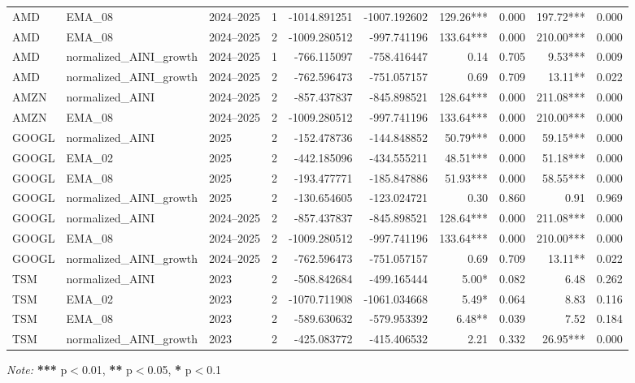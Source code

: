 \begin{table}[H]
{\begin{tabular}{l l l r r r r r r r}
AMD & EMA\_08 & 2024--2025 & 1 & -1014.891251 & -1007.192602 & 129.26*** & 0.000 & 197.72*** & 0.000 \\
AMD & EMA\_08 & 2024--2025 & 2 & -1009.280512 & -997.741196 & 133.64*** & 0.000 & 210.00*** & 0.000 \\
AMD & normalized\_AINI\_growth & 2024--2025 & 1 & -766.115097 & -758.416447 & 0.14 & 0.705 & 9.53*** & 0.009 \\
AMD & normalized\_AINI\_growth & 2024--2025 & 2 & -762.596473 & -751.057157 & 0.69 & 0.709 & 13.11** & 0.022 \\
AMZN & normalized\_AINI & 2024--2025 & 2 & -857.437837 & -845.898521 & 128.64*** & 0.000 & 211.08*** & 0.000 \\
AMZN & EMA\_08 & 2024--2025 & 2 & -1009.280512 & -997.741196 & 133.64*** & 0.000 & 210.00*** & 0.000 \\
GOOGL & normalized\_AINI & 2025 & 2 & -152.478736 & -144.848852 & 50.79*** & 0.000 & 59.15*** & 0.000 \\
GOOGL & EMA\_02 & 2025 & 2 & -442.185096 & -434.555211 & 48.51*** & 0.000 & 51.18*** & 0.000 \\
GOOGL & EMA\_08 & 2025 & 2 & -193.477771 & -185.847886 & 51.93*** & 0.000 & 58.55*** & 0.000 \\
GOOGL & normalized\_AINI\_growth & 2025 & 2 & -130.654605 & -123.024721 & 0.30 & 0.860 & 0.91 & 0.969 \\
GOOGL & normalized\_AINI & 2024--2025 & 2 & -857.437837 & -845.898521 & 128.64*** & 0.000 & 211.08*** & 0.000 \\
GOOGL & EMA\_08 & 2024--2025 & 2 & -1009.280512 & -997.741196 & 133.64*** & 0.000 & 210.00*** & 0.000 \\
GOOGL & normalized\_AINI\_growth & 2024--2025 & 2 & -762.596473 & -751.057157 & 0.69 & 0.709 & 13.11** & 0.022 \\
TSM & normalized\_AINI & 2023 & 2 & -508.842684 & -499.165444 & 5.00* & 0.082 & 6.48 & 0.262 \\
TSM & EMA\_02 & 2023 & 2 & -1070.711908 & -1061.034668 & 5.49* & 0.064 & 8.83 & 0.116 \\
TSM & EMA\_08 & 2023 & 2 & -589.630632 & -579.953392 & 6.48** & 0.039 & 7.52 & 0.184 \\
TSM & normalized\_AINI\_growth & 2023 & 2 & -425.083772 & -415.406532 & 2.21 & 0.332 & 26.95*** & 0.000 \\
\bottomrule
\end{tabular}

}
\vspace{0.2cm}
\textit{Note:} \textbf{***} p$<$0.01, \textbf{**} p$<$0.05, \textbf{*} p$<$0.1
\end{table}